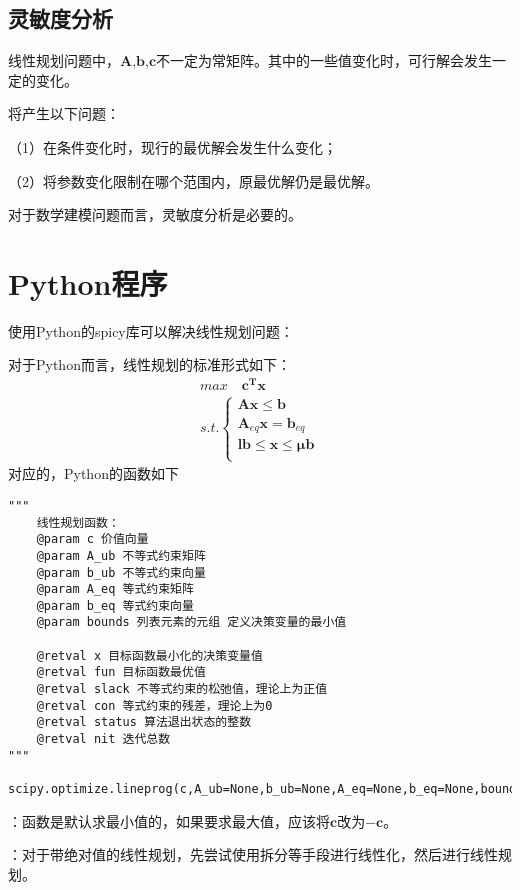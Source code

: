 \documentclass{article}
\begin{document}
\subsection{灵敏度分析}
线性规划问题中，$\bm{A}$,$\bm{b}$,$\bm{c}$不一定为常矩阵。其中的一些值变化时，可行解会发生一定的变化。

将产生以下问题：

（1）在条件变化时，现行的最优解会发生什么变化； 

（2）将参数变化限制在哪个范围内，原最优解仍是最优解。

对于数学建模问题而言，灵敏度分析是必要的。

\section{Python程序}

使用Python的spicy库可以解决线性规划问题：

对于Python而言，线性规划的标准形式如下：
	\begin{equation}
		\begin{split}
			max \quad \bm{c^Tx} \\
			s.t.\begin{cases}
				\bm{Ax} \leq \bm{b} \\ 
				\bm{A}_{eq}\bm{x} = \bm{b}_{eq} \\
				\bm{lb} \leq \bm{x} \leq \bm{\mu b}	\\
			\end{cases}
		\end{split}
	\end{equation}
对应的，Python的函数如下
\begin{verbatim}
"""
	线性规划函数：
	@param c 价值向量
	@param A_ub 不等式约束矩阵
	@param b_ub 不等式约束向量
	@param A_eq 等式约束矩阵
	@param b_eq 等式约束向量
	@param bounds 列表元素的元组 定义决策变量的最小值

	@retval x 目标函数最小化的决策变量值
	@retval fun 目标函数最优值
	@retval slack 不等式约束的松弛值，理论上为正值
	@retval con 等式约束的残差，理论上为0
	@retval status 算法退出状态的整数
	@retval nit 迭代总数
"""
	scipy.optimize.lineprog(c,A_ub=None,b_ub=None,A_eq=None,b_eq=None,bounds=None,method='simplex',callback=None,options=None)
\end{verbatim}

：函数是默认求最小值的，如果要求最大值，应该将$\bm{c}$改为$\bm{-c}$。

：对于带绝对值的线性规划，先尝试使用拆分等手段进行线性化，然后进行线性规划。
\end{document}
